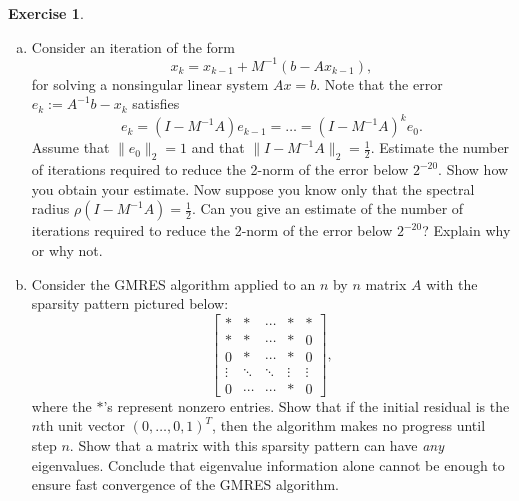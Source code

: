 \documentclass[12pt]{article}
\theoremstyle{definition}
\newtheorem{exer}{Exercise}
\theoremstyle{remark}
\begin{document}
\begin{exer}
    \begin{enumerate}[(a)]
\item
Consider an iteration of the form 
\[
x_k = x_{k-1} + M^{-1} ( b - A x_{k-1} ) ,
\]
for solving a nonsingular linear system $Ax=b$.  Note that the error $e_k := A^{-1} b - x_k$
satisfies
\[
e_k = (I - M^{-1} A) e_{k-1} = \ldots = (I - M^{-1} A)^k e_0.
\]
Assume that $\| e_0 \|_2 = 1$ and that $\| I - M^{-1} A \|_2 = \frac{1}{2}$.
Estimate the number of iterations required to reduce the 2-norm of the error below $2^{-20}$.
Show how you obtain your estimate.  Now suppose you know only that the spectral radius
$\rho ( I - M^{-1} A ) = \frac{1}{2}$.  Can you give an estimate of the number of iterations
required to reduce the 2-norm of the error below $2^{-20}$?  Explain why or why not.

\item
Consider the GMRES algorithm applied to an $n$ by $n$ matrix $A$ with the sparsity pattern 
pictured below:
\[
\left[ \begin{array}{ccccc}
\ast & \ast & \cdots & \ast & \ast \\
\ast & \ast & \cdots & \ast & 0 \\
0    & \ast & \cdots & \ast & 0 \\
\vdots  & \ddots & \ddots & \vdots & \vdots \\
0    & \cdots    & \cdots & \ast & 0 \end{array} \right] ,
\]
where the $\ast$'s represent nonzero entries.  Show that if the initial residual is the 
$n$th unit vector $( 0, \ldots , 0 , 1 )^T$, then the algorithm makes no progress
until step $n$.  Show that a matrix with this sparsity pattern can have {\em any}
eigenvalues.  Conclude that eigenvalue information alone cannot be enough to ensure
fast convergence of the GMRES algorithm.
\end{enumerate}
\end{exer}
\end{document}
